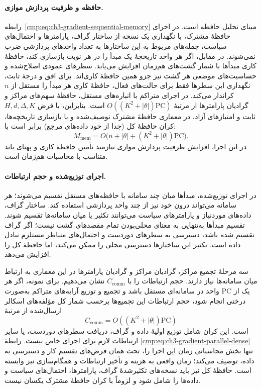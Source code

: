 \paragraph{حافظه و ظرفیت پردازش موازی.}
رابطه~\eqref{cmp:eq:ch3-gradient-sequential-memory}
مبنای تحلیل حافظه است. در اجرای حافظهٔ مشترک،
با نگهداری یک نسخه از ساختار گراف، پارامترها
و احتمال‌های سیاست، جمله‌های مربوط به این
ساختارها به تعداد واحدهای پردازشی ضرب نمی‌شوند.
در مقابل، اگر هر واحد تاریخچهٔ یک مبدأ را
در هر نوبت بازسازی کند، حافظهٔ کاری مبدأها
با شمار گشت‌های هم‌زمان افزایش می‌یابد.
سطرهای عمودی اصلاح‌شده و حساسیت‌های موضعی
هر گشت نیز جزو همین حافظهٔ کاری‌اند.
برای افق و درجهٔ ثابت، نگهداری این سطرها
فقط برای حالت‌های فعال، حافظهٔ کاری هر
مبدأ را مستقل از $n$ کراندار می‌کند.
در اجرای متراکم با انباره‌های مستقل، حافظهٔ
سهم‌های مراکز و گرادیان پارامترها از مرتبهٔ
$O((K^2+|\theta|)\mathrm{PC})$ است.
بنابراین، با فرض $H,d,\Delta,K$ ثابت و
امتیازهای آزاد، در معماری حافظهٔ مشترک
توصیف‌شده و با بازسازی تاریخچه‌ها، کران
حافظهٔ کل (جدا از خود داده‌های مرجع) برابر است با:
\[
M_{\mathrm{mem}}=
O\bigl(n+|\theta|+(K^2+|\theta|)\mathrm{PC}\bigr).
\]
در این اجرا، افزایش ظرفیت پردازش موازی
نیازمند تأمین حافظهٔ کاری و پهنای باند
متناسب با محاسبات هم‌زمان است.

\paragraph{اجرای توزیع‌شده و حجم ارتباطات.}
در اجرای توزیع‌شده، مبدأها میان چند سامانه
با حافظه‌های مستقل تقسیم می‌شوند؛ هر سامانه
می‌تواند درون خود نیز از چند واحد پردازشی
استفاده کند. ساختار گراف، داده‌های موردنیاز
و پارامترهای سیاست می‌توانند تکثیر یا میان
سامانه‌ها تقسیم شوند. تقسیم مبدأها به‌تنهایی
به معنای محلی‌بودن تمام مقصدهای گشت نیست؛
اگر گراف تقسیم شده باشد، دسترسی به سطرهای
دوردست و احتمال‌های متناظر مستلزم تبادل داده
است. تکثیر این ساختارها دسترسی محلی را ممکن
می‌کند، اما حافظهٔ کل را افزایش می‌دهد.

سه مرحلهٔ تجمیع مراکز، گرادیان مراکز و
گرادیان پارامترها در این معماری به ارتباط
میان سامانه‌ها نیاز دارند. حجم ارتباطات را
با $C_{\mathrm{comm}}$ نشان می‌دهیم.
برای نمونه، اگر هر یک از $\mathrm{PC}$ واحد
در سامانه‌ای مستقل باشد و تجمیع و توزیع
آرایه‌های متراکم به‌صورت درختی انجام شود،
حجم ارتباطات این تجمیع‌ها برحسب شمار کل
مؤلفه‌های اسکالر ارسال‌شده از مرتبهٔ
\[
C_{\mathrm{comm}}=
O((K^2+|\theta|)\mathrm{PC})
\]
است. این کران شامل توزیع اولیهٔ داده و گراف،
دریافت سطرهای دوردست، یا سایر ارتباطات لازم
برای اجرای خاص نیست. رابطهٔ
\eqref{cmp:eq:ch3-gradient-parallel-dense}
تنها بخش محاسباتی زمان این اجرا را، تحت
همان فرض‌های تقسیم کار و دسترسی به داده،
توصیف می‌کند؛ زمان واقعی به هزینه و تأخیر
ارتباطات و همگام‌سازی نیز وابسته است.
حافظهٔ کل نیز باید نسخه‌های تکثیرشدهٔ گراف،
پارامترها، احتمال‌های سیاست و داده‌ها را
شامل شود و لزوماً با کران حافظهٔ مشترک
یکسان نیست.

